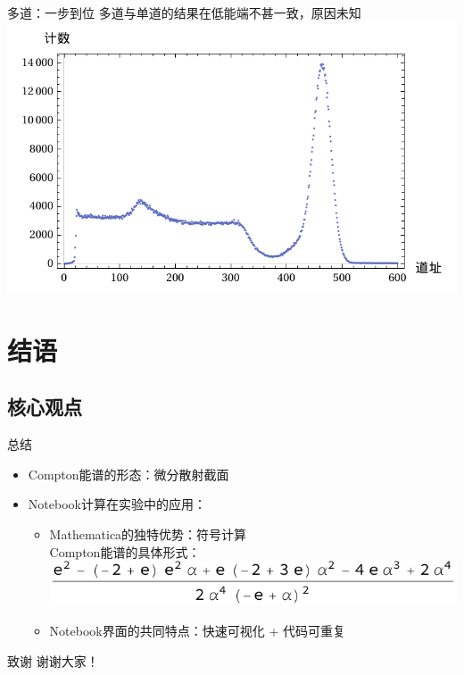 \documentclass[aspectratio=169,10pt
]{beamer}
\begin{document}
\begin{frame}{多道：一步到位}{
	多道与单道的结果在低能端不甚一致，原因未知
}
	\includegraphics[height=.75\textheight]{../data/plots/csSpectrumTruncated.pdf}
\end{frame}


\section{结语}
\subsection{核心观点}
\begin{frame}{总结}
	\begin{itemize}
	\item Compton能谱的形态：微分散射截面
	\item Notebook计算在实验中的应用：
		\begin{itemize}
		\item Mathematica的独特优势：符号计算\\[.5ex]
			\quad Compton能谱的具体形式：\\[1.ex]
			\qquad\includegraphics[width=.5\linewidth]{../data/comptonSectionByEnergyOut.pdf}
		\item Notebook界面的共同特点：快速可视化 + 代码可重复
		\end{itemize}
	\end{itemize}
\end{frame}


\begin{frame}{致谢}
	\Huge
	\noindent
	\quad 谢谢大家！
\end{frame}

\end{document}

